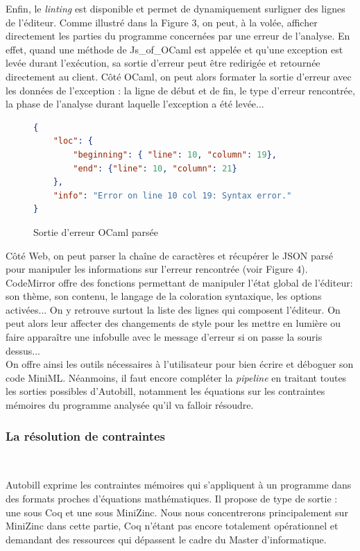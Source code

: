 \documentclass[12pt]{article}
\begin{document}
Enfin, le \textit{linting} est disponible et permet de dynamiquement surligner des lignes de l'éditeur. Comme illustré dans la Figure 3, on peut, à la volée, afficher directement les parties du programme concernées par une erreur de l'analyse. En effet, quand une méthode de Js\_of\_OCaml est appelée et qu'une exception est levée durant l'exécution, sa sortie d'erreur peut être redirigée et retournée directement au client. Côté OCaml, on peut alors formater la sortie d'erreur avec les données de l'exception : la ligne de début et de fin, le type d'erreur rencontrée, la phase de l'analyse durant laquelle l'exception a été levée... \\
\begin{figure}
      \centering
      \begin{lstlisting}[language=json,firstnumber=1]
{
    "loc": {
        "beginning": { "line": 10, "column": 19},
        "end": {"line": 10, "column": 21}
    },
    "info": "Error on line 10 col 19: Syntax error."
}
\end{lstlisting}
      \caption{Sortie d'erreur OCaml parsée}
\end{figure}

Côté Web, on peut parser la chaîne de caractères et récupérer le JSON parsé pour manipuler les informations sur l'erreur rencontrée (voir Figure 4). CodeMirror offre des fonctions permettant de manipuler l'état global de l'éditeur: son thème, son contenu, le langage de la coloration syntaxique, les options activées... On y retrouve surtout la liste des lignes qui composent l'éditeur. On peut alors leur affecter des changements de style pour les mettre en lumière ou faire apparaître une infobulle avec le message d'erreur si on passe la souris dessus... \\

On offre ainsi les outils nécessaires à l'utilisateur pour bien écrire et déboguer son code MiniML. Néanmoins, il faut encore compléter la \textit{pipeline} en traitant toutes les sorties possibles d'Autobill, notamment les équations sur les contraintes mémoires du programme analysée qu'il va falloir résoudre.

\subsubsection{La résolution de contraintes}\

Autobill exprime les contraintes mémoires qui s'appliquent à un programme dans des formats proches d'équations mathématiques. Il propose de type de sortie : une sous Coq et une sous MiniZinc. Nous nous concentrerons principalement sur MiniZinc dans cette partie, Coq n'étant pas encore totalement opérationnel et demandant des ressources qui dépassent le cadre du Master d'informatique. \\
\end{document}
